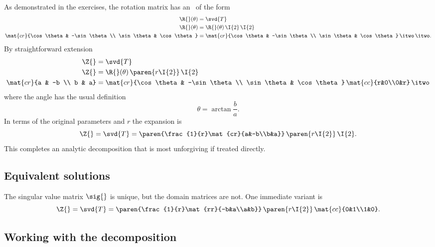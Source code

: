 As demonstrated in the exercises, the rotation matrix has an \svdl \ of the form
\begin{equation}
  \begin{split}
    \R{}(\theta) &= \svd{T} \\
    \R{}(\theta) &= \R{}(\theta) \, \I{2} \, \I{2}\\
    \mat{cr}{\cos \theta & -\sin \theta \\ \sin \theta & \cos \theta} &= \mat{cr}{\cos \theta & -\sin \theta \\ \sin \theta & \cos \theta}\, \itwo \, \itwo.
  \end{split}
\end{equation}
By straightforward extension
\begin{equation}
  \begin{split}
    \Z{} &= \svd{T} \\
    \Z{} &= \R{}(\theta)\,\paren{r\I{2}}\,\I{2}\\
    \mat{cr}{a & -b \\ b & a} &= \mat{cr}{\cos \theta & -\sin \theta \\ \sin \theta & \cos \theta}\, \mat{cc}{r&0\\0&r} \, \itwo
  \end{split}
\end{equation}
where the angle has the usual definition
\begin{equation}
  \theta = \arctan \frac{b}{a}.
\end{equation}
In terms of the original parameters and $r$ the expansion is
\begin{equation}
  \Z{} = \svd{T} = \paren{\frac{1}{r}\mat{cr}{a&-b\\b&a}}\,\paren{r\I{2}}\,\I{2}.
\end{equation}
This completes an analytic decomposition that is most unforgiving if treated directly.

\subsection{Equivalent solutions}
The singular value matrix $\sig{}$ is unique, but the domain matrices are not. One immediate variant is
\begin{equation}
  \Z{} = \svd{T} = \paren{\frac{1}{r}\mat{rr}{-b&a\\a&b}}\,\paren{r\I{2}}\,\mat{cc}{0&1\\1&0}.
\end{equation}

\subsection{Working with the decomposition}

